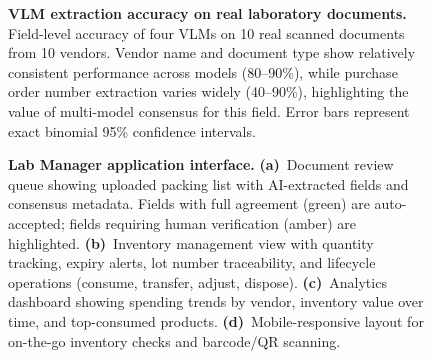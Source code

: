 \documentclass[11pt]{article}
\begin{document}
\begin{figure}[ht]
  \centering
  \caption{\textbf{VLM extraction accuracy on real laboratory documents.}
  Field-level accuracy of four VLMs on 10 real scanned documents from 10
  vendors. Vendor name and document type show relatively consistent
  performance across models (80--90\%), while purchase order number
  extraction varies widely (40--90\%), highlighting the value of
  multi-model consensus for this field. Error bars represent exact
  binomial 95\% confidence intervals.}
  \label{fig:benchmark}
\end{figure}

\begin{figure}[ht]
  \centering
  \caption{\textbf{Lab Manager application interface.}
  \textbf{(a)}~Document review queue showing uploaded packing list with
  AI-extracted fields and consensus metadata. Fields with full agreement
  (green) are auto-accepted; fields requiring human verification (amber)
  are highlighted.
  \textbf{(b)}~Inventory management view with quantity tracking, expiry
  alerts, lot number traceability, and lifecycle operations (consume,
  transfer, adjust, dispose).
  \textbf{(c)}~Analytics dashboard showing spending trends by vendor,
  inventory value over time, and top-consumed products.
  \textbf{(d)}~Mobile-responsive layout for on-the-go inventory checks
  and barcode/QR scanning.}
  \label{fig:screenshots}
\end{figure}
\end{document}
